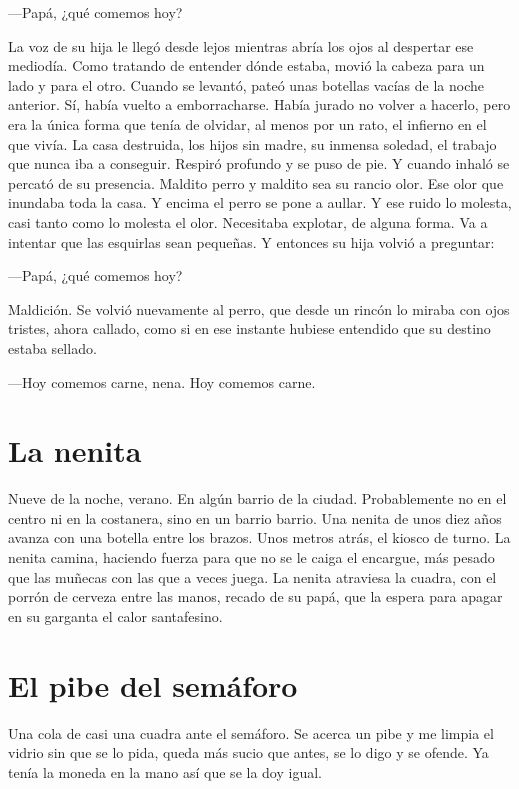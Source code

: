 \documentclass[11pt,twoside,openright,a6paper]{book}
\begin{document}
---Papá, ¿qué comemos hoy?

La voz de su hija le llegó desde lejos mientras abría los ojos al despertar ese mediodía. Como tratando de entender dónde estaba, movió la cabeza para un lado y para el otro. Cuando se levantó, pateó unas botellas vacías de la noche anterior. Sí, había vuelto a emborracharse. Había jurado no volver a hacerlo, pero era la única forma que tenía de olvidar, al menos por un rato, el infierno en el que vivía. La casa destruida, los hijos sin madre, su inmensa soledad, el trabajo que nunca iba a conseguir. Respiró profundo y se puso de pie. Y cuando inhaló se percató de su presencia. Maldito perro y maldito sea su rancio olor. Ese olor que inundaba toda la casa. Y encima el perro se pone a aullar. Y ese ruido lo molesta, casi tanto como lo molesta el olor. Necesitaba explotar, de alguna forma. Va a intentar que las esquirlas sean pequeñas.
Y entonces su hija volvió a preguntar:

---Papá, ¿qué comemos hoy?

Maldición. Se volvió nuevamente al perro, que desde un rincón lo miraba con ojos tristes, ahora callado, como si en ese instante hubiese entendido que su destino estaba sellado.

---Hoy comemos carne, nena. Hoy comemos carne.

\chapter*{La nenita}

Nueve de la noche, verano. En algún barrio de la ciudad.
Probablemente no en el centro ni en la costanera, sino en un barrio barrio. 
Una nenita de unos diez años avanza con una botella entre los brazos. 
Unos metros atrás, el kiosco de turno. 
La nenita camina, haciendo fuerza para que no se le caiga el encargue, más pesado que las muñecas con las que a veces juega. 
La nenita atraviesa la cuadra, con el porrón de cerveza entre las manos, recado de su papá, que la espera para apagar en su garganta el calor santafesino.

\chapter*{El pibe del semáforo}

Una cola de casi una cuadra ante el semáforo. Se acerca un pibe y me limpia el vidrio sin que se lo pida, queda más sucio que antes, se lo digo y se ofende. Ya tenía la moneda en la mano así que se la doy igual.
\end{document}
